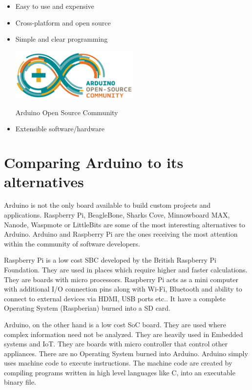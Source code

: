 \begin{itemize}
    \item Easy to use and expensive
    \item Cross-platform and open source
    \item Simple and clear programming
    
    \begin{marginfigure}
        \hspace{-1.5in}\includegraphics[width=2.5in]{Images/Intro_Arduino/arduino_community.png}
        \caption{Arduino Open Source Community}
    \end{marginfigure} 
    
    \item  Extensible software/hardware
\end{itemize}   

\section{Comparing Arduino to its alternatives}
\par Arduino is not the only board available to build custom projects and applications. Raspberry Pi, BeagleBone, Sharks Cove, Minnowboard MAX, Nanode, Waspmote or LittleBits are some of the most interesting alternatives to Arduino. Arduino and Raspberry Pi are the ones receiving the most attention within the community of software developers.

\par Raspberry Pi is a low cost \ac{SBC} developed by the British Raspberry Pi Foundation. They are used in places which require higher and faster calculations. They are boards with micro processors. Raspberry Pi acts as a mini computer with additional I/O connection pins along with Wi-Fi, Bluetooth and ability to connect to external devices via HDMI, USB ports etc.. It have a complete Operating System (Raspberian) burned into a SD card. 

\par Arduino, on the other hand is a low cost \ac{SoC} board. They are used where complex information need not be analyzed. They are heavily used in Embedded systems and \ac{IoT}. They are boards with micro controller that control other appliances. There are no Operating System burned into Arduino. Arduino simply uses machine code to execute instructions. The machine code are created by compiling programs written in high level languages like C, into an executable binary file.

